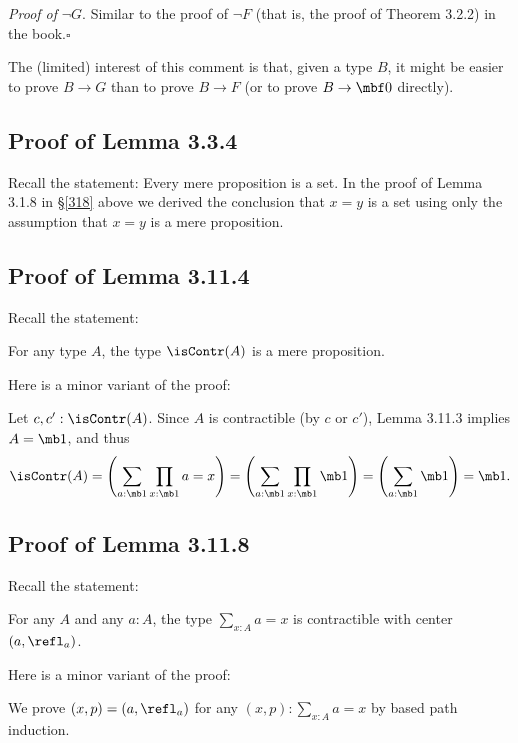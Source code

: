 \documentclass[12pt]{article}
\begin{document}
\emph{Proof of} $\neg G$. Similar to the proof of $\neg F$ (that is, the proof of Theorem 3.2.2) in the book.$\square$

The (limited) interest of this comment is that, given a type $B$, it might be easier to prove $B\to G$ than to prove $B\to F$ (or to prove $B\to\mbf0$ directly).




\subsection{Proof of Lemma 3.3.4}

Recall the statement: Every mere proposition is a set. In the proof of Lemma 3.1.8 in \S\ref{318} above we derived the conclusion that $x=y$ is a set using only the assumption that $x=y$ is a mere proposition.


\subsection{Proof of Lemma 3.11.4} 

Recall the statement: 

For any type $A$, the type $\isContr(A)$ is a mere proposition.

Here is a minor variant of the proof:

Let $c,c':\isContr(A)$. Since $A$ is contractible (by $c$ or $c'$), Lemma 3.11.3 implies $A=\mb1$, and thus 
$$
\isContr(A)=\left(\sum_{a:\mb1}\prod_{x:\mb1}a=x\right)=\left(\sum_{a:\mb1}\prod_{x:\mb1}\mb1\right)=\left(\sum_{a:\mb1}\mb1\right)=\mb1.
$$


\subsection{Proof of Lemma 3.11.8} 

Recall the statement: 

For any $A$ and any $a:A$, the type $\sum_{x:A}a=x$ is contractible with center $(a,\refl_a)$. 

Here is a minor variant of the proof:

We prove $(x,p)=(a,\refl_a)$ for any $(x,p):\sum_{x:A}a=x$ by based path induction.
\end{document}
